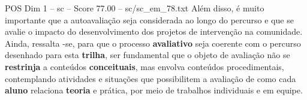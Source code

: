 \begin{textsample}{POS Dim 1 – sc – Score 77.00 – sc/sc\_em\_78.txt}
Além disso, é muito importante que a autoavaliação seja considerada ao longo do percurso e que se avalie o impacto do desenvolvimento dos projetos de intervenção na comunidade.
Ainda, ressalta -se, para que o processo \textbf{avaliativo} seja coerente com o percurso desenhado para esta \textbf{trilha}, ser fundamental que o objeto de avaliação não se \textbf{restrinja} a conteúdos \textbf{conceituais}, mas envolva conteúdos procedimentais, contemplando atividades e situações que possibilitem a avaliação de como cada \textbf{aluno} relaciona \textbf{teoria} e prática, por meio de trabalhos individuais e em equipe.

\end{textsample}
